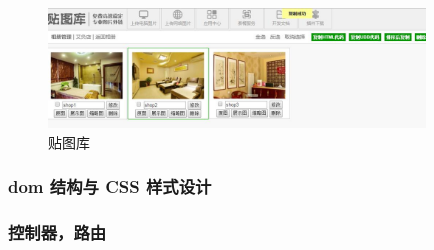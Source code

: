 \documentclass[UTF8]{ctexbook}
\begin{document}
        \begin{figure}[H]
          \centering
          \includegraphics[width=10cm]{./img/tietuku.jpg}
          \caption{贴图库}
          \label{fig:tietuku}
        \end{figure}

      \subsubsection{dom 结构与 CSS 样式设计}
        \label{subsubsec:dom_结构与_css_样式设计}


      \subsubsection{控制器，路由}
        \label{subsubsec:控制器_路由}
\end{document}
